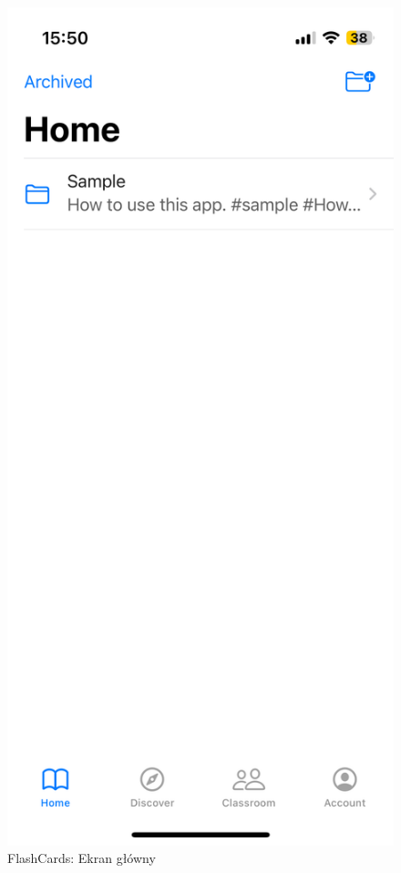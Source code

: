 \documentclass[final,a4paper,openany,12pt]{mwbk}
\begin{document}
\begin{figure}[H]
\centering
\begin{minipage}{0.5\textwidth}
  \centering
\includegraphics[width=.75\linewidth]{img/flashcards1.PNG}
  \caption{FlashCards: Ekran główny}
  \label{fig:flashcards1}
\end{minipage}%
\begin{minipage}{0.5\textwidth}
  \centering

\end{minipage}
\end{figure}
\end{document}
